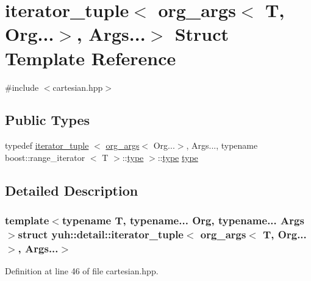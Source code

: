 \hypertarget{structyuh_1_1detail_1_1iterator__tuple_3_01org__args_3_01T_00_01Org_8_8_8_4_00_01Args_8_8_8_4}{\section{iterator\-\_\-tuple$<$ org\-\_\-args$<$ \-T, \-Org...$>$, \-Args...$>$ \-Struct \-Template \-Reference}
\label{d2/de2/structyuh_1_1detail_1_1iterator__tuple_3_01org__args_3_01T_00_01Org_8_8_8_4_00_01Args_8_8_8_4}
}


{\ttfamily \#include $<$cartesian.\-hpp$>$}

\subsection*{\-Public \-Types}
\begin{DoxyCompactItemize}
\item 
typedef \hyperlink{structyuh_1_1detail_1_1iterator__tuple}{iterator\-\_\-tuple}\*
$<$ \hyperlink{structyuh_1_1detail_1_1org__args}{org\-\_\-args}$<$ \-Org...$>$, \-Args..., \*
typename boost\-::range\-\_\-iterator\*
$<$ \-T $>$\-::\hyperlink{structyuh_1_1detail_1_1iterator__tuple_3_01org__args_3_01T_00_01Org_8_8_8_4_00_01Args_8_8_8_4_a22487632bf6ac08da23ab56b24fcd551}{type} $>$\-::\hyperlink{structyuh_1_1detail_1_1iterator__tuple_3_01org__args_3_01T_00_01Org_8_8_8_4_00_01Args_8_8_8_4_a22487632bf6ac08da23ab56b24fcd551}{type} \hyperlink{structyuh_1_1detail_1_1iterator__tuple_3_01org__args_3_01T_00_01Org_8_8_8_4_00_01Args_8_8_8_4_a22487632bf6ac08da23ab56b24fcd551}{type}
\end{DoxyCompactItemize}


\subsection{\-Detailed \-Description}
\subsubsection*{template$<$typename T, typename... \-Org, typename... \-Args$>$struct yuh\-::detail\-::iterator\-\_\-tuple$<$ org\-\_\-args$<$ T, Org...$>$, Args...$>$}



\-Definition at line 46 of file cartesian.\-hpp.



